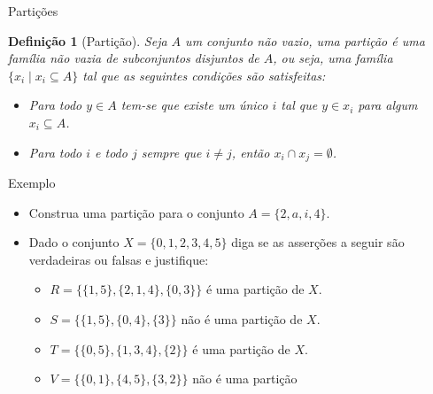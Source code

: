 \documentclass[aspectratio=169]{beamer}
\newtheorem{defi}{Definição}
\begin{document}
	\begin{frame}{Partições}
		\begin{defi}[Partição]\label{def:ParticaoConjuntos}
			Seja $A$ um conjunto não vazio, uma partição é uma família não vazia de subconjuntos disjuntos de $A$, ou seja, uma família $\{x_i \mid x_i \subseteq A\}$ tal que as seguintes condições são satisfeitas:
			\begin{itemize}
				\item[(1)] Para todo $y \in A$ tem-se que existe um único $i$ tal que $y \in x_i$ para algum $x_i \subseteq A$.
				\item[(2)] Para todo $i$ e todo $j$ sempre que $i \neq j$, então $x_i \cap x_j = \emptyset$.
			\end{itemize}
		\end{defi}
	\end{frame}

	\begin{frame}{Exemplo}
		\begin{itemize}
			\item Construa uma partição para o conjunto $A = \{2, a, i, 4\}$.
			\item Dado o conjunto $X = \{0, 1, 2, 3, 4, 5\}$ diga se as asserções a seguir são verdadeiras ou falsas e justifique:
			\begin{itemize}
				\item $R = \{\{1, 5\}, \{2, 1, 4\}, \{0, 3\}\}$ é uma partição de $X$.
				\item $S = \{\{1, 5\}, \{0, 4\}, \{3\}\}$ não é uma partição de $X$.
				\item $T = \{\{0, 5\}, \{1, 3, 4\}, \{2\}\}$ é uma partição de $X$.
				\item $V = \{\{0, 1\}, \{4, 5\}, \{3, 2\}\}$ não é uma partição
			\end{itemize}
		\end{itemize}
	\end{frame}
	
\end{document}
